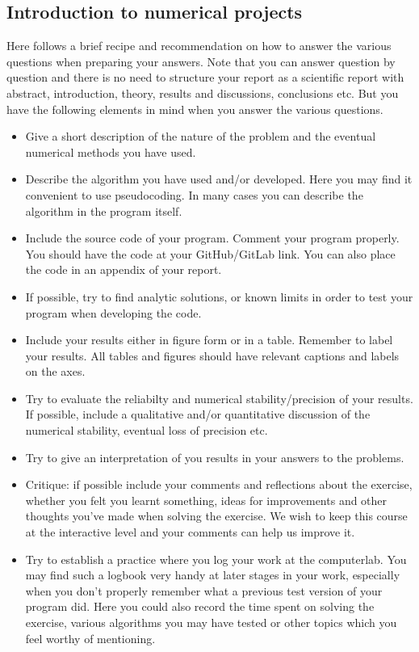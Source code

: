 \documentclass[%
oneside,                 %
final,                   %
10pt]{article}
\begin{document}
\noindent
\subsection*{Introduction to numerical projects}

Here follows a brief recipe and recommendation on how to answer the various questions when preparing your answers. Note that you can answer question by question and there is no need to structure your report as a scientific report with abstract, introduction, theory, results and discussions, conclusions etc. But you have the following elements in mind when you answer the various questions.


\begin{itemize}
  \item Give a short description of the nature of the problem and the eventual  numerical methods you have used.

  \item Describe the algorithm you have used and/or developed. Here you may find it convenient to use pseudocoding. In many cases you can describe the algorithm in the program itself.

  \item Include the source code of your program. Comment your program properly. You should have the code at your GitHub/GitLab link. You can also place the code in an appendix of your report.

  \item If possible, try to find analytic solutions, or known limits in order to test your program when developing the code.

  \item Include your results either in figure form or in a table. Remember to        label your results. All tables and figures should have relevant captions        and labels on the axes.

  \item Try to evaluate the reliabilty and numerical stability/precision of your results. If possible, include a qualitative and/or quantitative discussion of the numerical stability, eventual loss of precision etc.

  \item Try to give an interpretation of you results in your answers to  the problems.

  \item Critique: if possible include your comments and reflections about the  exercise, whether you felt you learnt something, ideas for improvements and  other thoughts you've made when solving the exercise. We wish to keep this course at the interactive level and your comments can help us improve it.

  \item Try to establish a practice where you log your work at the  computerlab. You may find such a logbook very handy at later stages in your work, especially when you don't properly remember  what a previous test version  of your program did. Here you could also record  the time spent on solving the exercise, various algorithms you may have tested or other topics which you feel worthy of mentioning.
\end{itemize}
\end{document}
